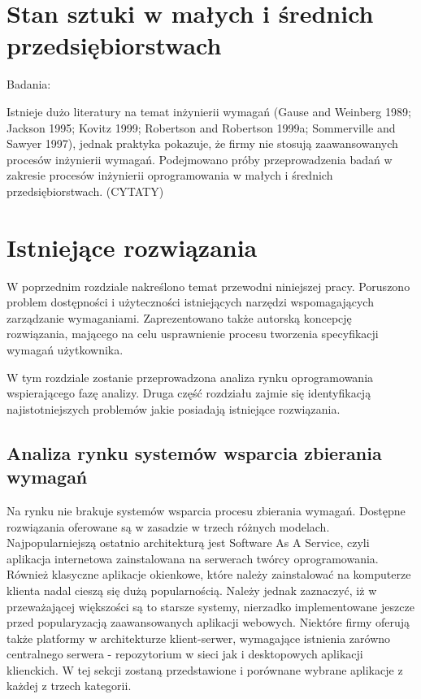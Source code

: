 \chapter{Stan sztuki w małych i średnich przedsiębiorstwach}

  Badania: \cite{Niku00, Kamis98}

  Istnieje dużo literatury na temat inżynierii wymagań (Gause and Weinberg 1989; Jackson 1995; Kovitz 1999; Robertson and Robertson 1999a; Sommerville and Sawyer 1997), jednak praktyka pokazuje, że firmy nie stosują zaawansowanych procesów inżynierii wymagań.
  Podejmowano próby przeprowadzenia badań w zakresie procesów inżynierii oprogramowania w małych i średnich przedsiębiorstwach. (CYTATY)

\chapter{Istniejące rozwiązania}

  W poprzednim rozdziale nakreślono temat przewodni niniejszej pracy. Poruszono problem dostępności i użyteczności istniejących narzędzi wspomagających zarządzanie wymaganiami. Zaprezentowano także autorską koncepcję rozwiązania, mającego na celu usprawnienie procesu tworzenia specyfikacji wymagań użytkownika. 

  W tym rozdziale zostanie przeprowadzona analiza rynku oprogramowania wspierającego fazę analizy. Druga część rozdziału zajmie się identyfikacją najistotniejszych problemów jakie posiadają istniejące rozwiązania. 

  \section{Analiza rynku systemów wsparcia zbierania wymagań}

    Na rynku nie brakuje systemów wsparcia procesu zbierania wymagań. Dostępne rozwiązania oferowane są w zasadzie w trzech różnych modelach. Najpopularniejszą ostatnio architekturą jest Software As A Service, czyli aplikacja internetowa zainstalowana na serwerach twórcy oprogramowania. Również klasyczne aplikacje okienkowe, które należy zainstalować na komputerze klienta nadal cieszą się dużą popularnością. Należy jednak zaznaczyć, iż w przeważającej większości są to starsze systemy, nierzadko implementowane jeszcze przed popularyzacją zaawansowanych aplikacji webowych. Niektóre firmy oferują także platformy w architekturze klient-serwer, wymagające istnienia zarówno centralnego serwera - repozytorium w sieci jak i desktopowych aplikacji klienckich. W tej sekcji zostaną przedstawione i porównane wybrane aplikacje z każdej z trzech kategorii. 

